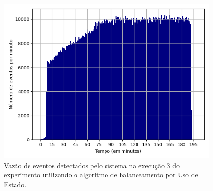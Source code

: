 





\begin{figure}[h]
\centering
\includegraphics[width=\textwidth]{figuras/graphics/histogram_vazao_8-dez-su.png}
\caption{Vazão de eventos detectados pelo sistema na execução 3 do experimento utilizando o algoritmo de balanceamento por Uso de Estado.}
\label{fig:vazao_8-dez-su}
\end{figure}



